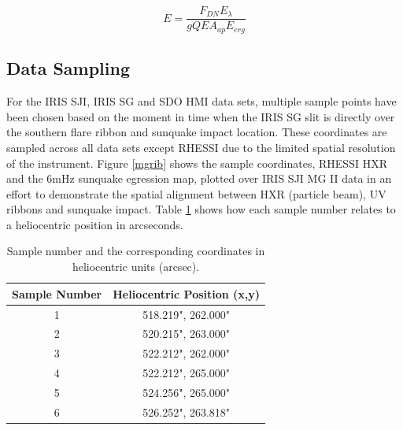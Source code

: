 \begin{equation}\label{hmiradiometriccal}
E = \frac{F_{DN} E_{\lambda}}{g QE A_{ap} E_{erg}}
\end{equation}

\subsection{Data Sampling}
For the IRIS SJI, IRIS SG and SDO HMI data sets, multiple sample points have been chosen based on the moment in time when the IRIS SG slit is directly over the southern flare ribbon and sunquake impact location. These coordinates are sampled across all data sets except RHESSI due to the limited spatial resolution of the instrument. Figure \ref{mgrib} shows the sample coordinates, RHESSI HXR and the 6mHz sunquake egression map, plotted over IRIS SJI MG II data in an effort to demonstrate the spatial alignment between HXR (particle beam), UV ribbons and sunquake impact. Table \ref{coordtab} shows how each sample number relates to a heliocentric position in arcseconds.
\centering

\begin{table}
\begin{tabular}{|c|c|}
\hline
Sample Number & Heliocentric Position (x,y)\\
\hline
1 & 518.219", 262.000"\\
2 & 520.215", 263.000"\\
3 & 522.212", 262.000"\\
4 & 522.212", 265.000"\\
5 & 524.256", 265.000"\\
6 & 526.252", 263.818"\\
\hline
\end{tabular}
\caption{Sample number and the corresponding coordinates in heliocentric units (arcsec).}\label{coordtab}
\end{table}

